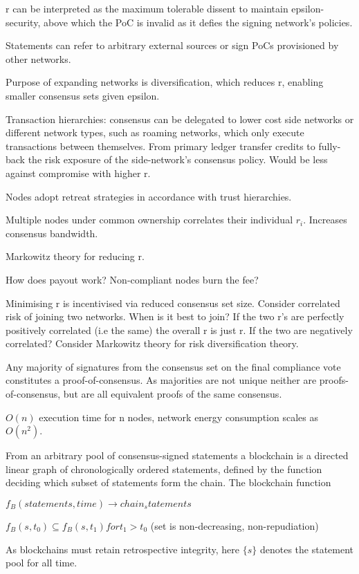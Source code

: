 r can be interpreted as the maximum tolerable dissent to maintain epsilon-security, above which the PoC is invalid as it defies the signing network’s policies.

Statements can refer to arbitrary external sources or sign PoCs provisioned by other networks.

Purpose of expanding networks is diversification, which reduces r, enabling smaller consensus sets given epsilon.

Transaction hierarchies: consensus can be delegated to lower cost side networks or different network types, such as roaming networks, which only execute transactions between themselves. From primary ledger transfer credits to fully-back the risk exposure of the side-network’s consensus policy.
Would be less against compromise with higher r.

Nodes adopt retreat strategies in accordance with trust hierarchies.

Multiple nodes under common ownership correlates their individual $r_i$. Increases consensus bandwidth.

Markowitz theory for reducing r.

How does payout work? Non-compliant nodes burn the fee?

Minimising r is incentivised via reduced consensus set size. Consider correlated risk of joining two networks. When is it best to join? If the two r’s are perfectly positively correlated (i.e the same) the overall r is just r. If the two are negatively correlated? Consider Markowitz theory for risk diversification theory.

Any majority of signatures from the consensus set on the final compliance vote constitutes a proof-of-consensus. As majorities are not unique neither are proofs-of-consensus, but are all equivalent proofs of the same consensus.

$O(n)$ execution time for n nodes, network energy consumption scales as $O(n^2)$.

From an arbitrary pool of consensus-signed statements a blockchain is a directed linear graph of chronologically ordered statements, defined by the function deciding which subset of statements form the chain. The blockchain function

$f_B({statements},time) \to {chain_statements}$

$f_B({s},t_0) \subseteq f_B({s},t_1) for t_1>t_0$
(set is non-decreasing, non-repudiation)

As blockchains must retain retrospective integrity, here $\{s\}$ denotes the statement pool for all time.

